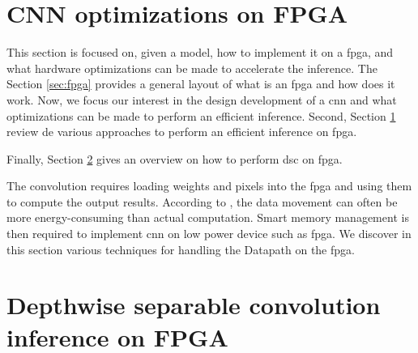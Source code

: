 \section{CNN optimizations on FPGA} \label{sec:opti_dataflow}
%
%
This section is focused on, given a model, how to implement it on a \acrshort{fpga}, and what hardware optimizations can be made to accelerate the inference.
The Section \ref{sec:fpga} provides a general layout of what is an \acrshort{fpga} and how does it work. Now, we focus our interest in the design development of a \acrshort{cnn} and what optimizations can be made to perform an efficient inference.
Second, Section \ref{sec:opti_dataflow} review de various approaches to perform an efficient inference on \acrshort{fpga}.

Finally, Section \ref{sec:inf_fpga} gives an overview on how to perform \acrshort{dsc} on \acrshort{fpga}.

The convolution requires loading weights and pixels into the \acrshort{fpga} and using them to compute the output results. According to \textcite{chen_eyeriss_2017}, the data movement can often be more energy-consuming than actual computation. Smart memory management is then required to implement \acrshort{cnn} on low power device such as \acrshort{fpga}. We discover in this section various techniques for handling the Datapath on the \acrshort{fpga}.
%

%
%
\section{Depthwise separable convolution inference on FPGA} \label{sec:inf_fpga}
%
%

